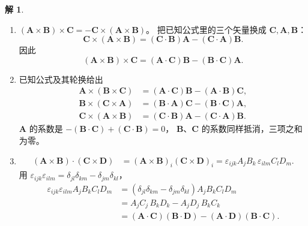 \documentclass[11pt]{article}
\theoremstyle{remark}
\theoremstyle{definition}
\newtheorem{solution}{解}
\begin{document}
\begin{solution}
\begin{enumerate}
  \item $(\mathbf{A}\times\mathbf{B})\times\mathbf{C}
    =-\mathbf{C}\times(\mathbf{A}\times\mathbf{B})$。
    把已知公式里的三个矢量换成 $\mathbf{C},\mathbf{A},\mathbf{B}$：
    \[
      \mathbf{C}\times(\mathbf{A}\times\mathbf{B})
      =(\mathbf{C}\cdot\mathbf{B})\mathbf{A}-(\mathbf{C}\cdot\mathbf{A})\mathbf{B}.
    \]
    因此
    \[
      (\mathbf{A}\times\mathbf{B})\times\mathbf{C}
      =(\mathbf{A}\cdot\mathbf{C})\mathbf{B}-(\mathbf{B}\cdot\mathbf{C})\mathbf{A}.
    \]

  \item 已知公式及其轮换给出
    \begin{align*}
      \mathbf{A}\times(\mathbf{B}\times\mathbf{C})
      &=(\mathbf{A}\cdot\mathbf{C})\mathbf{B}-(\mathbf{A}\cdot\mathbf{B})\mathbf{C},\\
      \mathbf{B}\times(\mathbf{C}\times\mathbf{A})
      &=(\mathbf{B}\cdot\mathbf{A})\mathbf{C}-(\mathbf{B}\cdot\mathbf{C})\mathbf{A},\\
      \mathbf{C}\times(\mathbf{A}\times\mathbf{B})
      &=(\mathbf{C}\cdot\mathbf{B})\mathbf{A}-(\mathbf{C}\cdot\mathbf{A})\mathbf{B}.
    \end{align*}
    $\mathbf{A}$ 的系数是 $-(\mathbf{B}\cdot\mathbf{C})+(\mathbf{C}\cdot\mathbf{B})=0$，
    $\mathbf{B}$、$\mathbf{C}$ 的系数同样抵消，三项之和为零。

  \item
    \begin{align*}
      (\mathbf{A}\times\mathbf{B})\cdot(\mathbf{C}\times\mathbf{D})
      &=(\mathbf{A}\times\mathbf{B})_i(\mathbf{C}\times\mathbf{D})_i
       =\varepsilon_{ijk}A_j B_k\,\varepsilon_{ilm}C_l D_m.
    \end{align*}
    用 $\varepsilon_{ijk}\varepsilon_{ilm}=\delta_{jl}\delta_{km}-\delta_{jm}\delta_{kl}$，
    \begin{align*}
      \varepsilon_{ijk}\varepsilon_{ilm}A_j B_k C_l D_m
      &=(\delta_{jl}\delta_{km}-\delta_{jm}\delta_{kl})A_j B_k C_l D_m \\
      &=A_j C_j\,B_k D_k-A_j D_j\,B_k C_k \\
      &=(\mathbf{A}\cdot\mathbf{C})(\mathbf{B}\cdot\mathbf{D})
        -(\mathbf{A}\cdot\mathbf{D})(\mathbf{B}\cdot\mathbf{C}).
    \end{align*}
\end{enumerate}
\end{solution}
\end{document}
